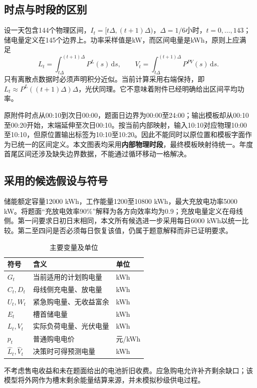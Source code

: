 \documentclass[UTF8,a4paper,zihao=-4,fontset=fandol]{ctexart}
\begin{document}
\subsection{时点与时段的区别}
设一天包含144个物理区间，$I_t=[t\Delta,(t+1)\Delta)$，$\Delta=1/6$小时，$t=0,\ldots,143$；储电量定义在145个边界上。功率采样值是kW，而区间电量是kWh，原则上应满足
\begin{equation}
 L_t=\int_{t\Delta}^{(t+1)\Delta}P^L(s)\,\mathrm ds,\qquad V_t=\int_{t\Delta}^{(t+1)\Delta}P^{PV}(s)\,\mathrm ds.
\end{equation}
只有离散点数据时必须声明积分近似。当前计算采用右端保持，即$L_t\approx P^L((t+1)\Delta)\Delta$，光伏同理。它不意味着附件已经明确给出区间平均功率。

原附件时点从00:10到次日00:00，题面日边界为00:00至24:00；输出模板却从00:10至00:20开始，末端延伸至次日00:10。按当前内部映射，输入10:10对应物理10:00至10:10，但原位置输出标签为10:10至10:20。因此不能同时以原位置和模板字面作为已统一的区间定义。本文图表均采用\textbf{内部物理时段}，最终模板映射待统一。年度首尾区间还涉及缺失边界数据，不能通过循环移动一格解决。

\subsection{采用的候选假设与符号}
储能额定容量12000 kWh，工作能量1200至10800 kWh，最大充放电功率5000 kW。将题面“充放电效率90\%”解释为各方向效率均为0.9；充放电量定义在母线侧。第一问要求日初日末相同，本文所有候选进一步采用每日6000 kWh以统一比较。第二至四问是否必须每日恢复该值，仍属于题意解释而非已证明要求。
\begin{table}[H]\centering\caption{主要变量及单位}
\begin{tabular}{lll}\toprule 符号 & 含义 & 单位\\\midrule
$G_t$ & 当前适用的计划购电量 & kWh\\
$C_t,D_t$ & 母线侧充电量、放电量 & kWh\\
$U_t,W_t$ & 紧急购电量、无收益富余 & kWh\\
$E_t$ & 槽首储电量 & kWh\\
$L_t,V_t$ & 实际负荷电量、光伏电量 & kWh\\
$p_t$ & 普通购电电价 & 元/kWh\\
$\widehat L_t,\widehat V_t$ & 决策时可得预测电量 & kWh\\\bottomrule\end{tabular}
\end{table}
不考虑售电收益和未在题面给出的电池折旧收费。应急购电允许补齐剩余缺口；该模型将外网作为槽末剩余能量结算来源，并未模拟秒级供电过程。
\end{document}
